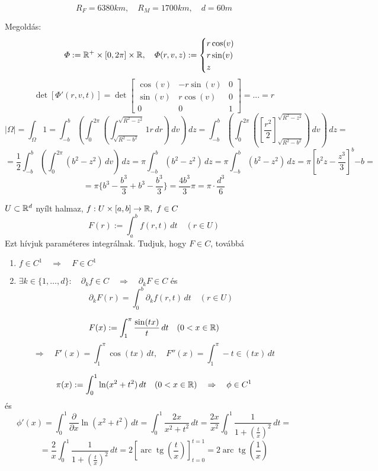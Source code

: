 \documentclass[a4paper,11.5pt]{article}
\DeclareMathOperator{\tg}{tg}
\DeclareMathOperator{\arc}{arc}
\begin{document}
	\begin{task}
		\[ R_F=6380km,\quad R_M=1700km,\quad d=60m \]
		
		Megoldás:
		\[ \varPhi:=\mathbb{R}^+\times[0,2\pi]\times\mathbb{R},\quad \varPhi(r,v,z):=\begin{cases}
			r\cos(v)\\
			r\sin(v)\\
			z
		\end{cases}\]\[ \det[\varPhi'(r,v,t)]=\det \begin{bmatrix}
			\cos(v)&-r\sin(v)&0\\
			\sin(v)&r\cos(v)&0\\
			0&0&1
		\end{bmatrix}=...=r \]
		\[ |\varOmega|=\int_{\varOmega}^{}1=\int_{-b}^{b}\left(\int_{0}^{2\pi}\left(\int_{\sqrt{R^2-b^2}}^{\sqrt{R^2-z^2}}1r\,dr\right)\,dv\right)\,dz=\int_{-b}^{b}\left(\int_0^{2\pi}\left(\left[\frac{r^2}{2}\right]_{\sqrt{R^2-b^2}}^{\sqrt{R^2-z^2}} \right)\,dv\right)\,dz=\]
		\[=\frac{1}{2}\int_{-b}^{b}\left(\int_{0}^{2\pi}(b^2-z^2)\,dv\right)\,dz=\pi\int_{-b}^{b}(b^2-z^2)\,dz=\pi\int_{-b}^{b}(b^2-z^2)\,dz=\pi\left[b^2z-\frac{z^3}{3}\right]^b{-b}=\]
		\[=\pi\{ b^3-\frac{b^3}{3}+b^3-\frac{b^3}{3} \}=\frac{4b^3}{3}\pi=\pi\cdot\frac{d^3}{6} \]
	\end{task}
	\begin{revision}
		$U\subset\mathbb{R}^d$ nyílt halmaz, $f:U\times[a,b]\to\mathbb{R},\ f\in C$
		\[ F(r):=\int_{a}^{b}f(r,t)\,dt\quad (r\in U) \]
		Ezt hívjuk paraméteres integrálnak. Tudjuk, hogy $F\in C$, továbbá
		\begin{enumerate}
			\item $f\in C^1\quad \Rightarrow\quad F\in C^1$
			\item $\exists k\in\{1,\ldots,d\}:\quad \partial_k f\in C\quad \Rightarrow\quad \partial_k F\in C$ és 
			\[ \partial_k F(r)=\int_0^b \partial_k f(r,t)\,dt\quad (r\in U) \]
		\end{enumerate}
	\end{revision}
	\begin{example}
		\[ F(x):=\int_1^\pi \frac{\sin(tx)}{t}\,dt\quad (0<x\in\mathbb{R}) \]
		\[ \Rightarrow\quad F'(x)=\int_1^\pi\cos(tx)\,dt,\quad F''(x)=\int_1^\pi -t\in(tx)\,dt \]
	\end{example}
	\begin{example}
		$$\pi(x):=\int_0^1\ln(x^2+t^2)\,dt\quad (0<x\in\mathbb{R})\quad \Rightarrow\quad \phi\in C^1$$ és $$\phi'(x)=\int_0^1\frac{\partial}{\partial x}\ln(x^2+t^2)\,dt=\int_0^1\frac{2x}{x^2+t^2}\,dt=\frac{2x}{x^2}\int_0^1\frac{1}{1+\left(\frac{t}{x}\right)^2}\,dt=$$
		$$=\frac{2}{x}\int_0^1\frac{1}{1+\left(\frac{t}{x}\right)^2}\,dt=2\left[\arc\tg\left(\frac{t}{x}\right)\right]_{t=0}^{t=1}=2\arc\tg\left(\frac{1}{x}\right)$$
	\end{example}
\end{document}
